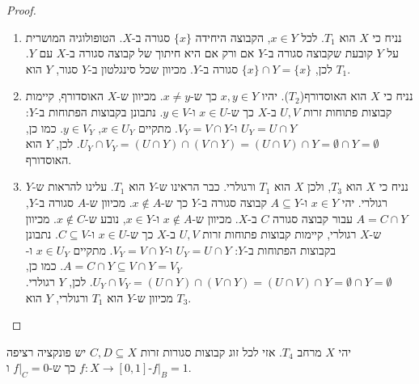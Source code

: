 \documentclass{tstextbook}
\begin{document}
\begin{proof}
  \begin{enumerate}
    \item נניח כי \(X\) הוא \(T_1\). לכל \(x \in Y\), הקבוצה היחידה \(\{x\}\) סגורה ב-\(X\). הטופולוגיה המושרית על \(Y\) קובעת שקבוצה סגורה ב-\(Y\) אם ורק אם היא חיתוך של קבוצה סגורה ב-\(X\) עם \(Y\). לכן, \(\{x\} \cap Y = \{x\}\) סגורה ב-\(Y\). מכיוון שכל סינגלטון ב-\(Y\) סגור, \(Y\) הוא \(T_1\). 


    \item נניח כי \(X\) הוא האוסדורף(\(T_{2}\)). יהיו \(x, y \in Y\) כך ש-\(x \neq y\). מכיוון ש-\(X\) האוסדורף, קיימות קבוצות פתוחות זרות \(U, V\) ב-\(X\) כך ש-\(x \in U\) ו-\(y \in V\). נתבונן בקבוצות הפתוחות ב-\(Y\): \(U_Y = U \cap Y\) ו-\(V_Y = V \cap Y\). מתקיים \(x \in U_Y\), \(y \in V_Y\). כמו כן, \(U_Y \cap V_Y = (U \cap Y) \cap (V \cap Y) = (U \cap V) \cap Y = \emptyset \cap Y = \emptyset\). לכן, \(Y\) הוא האוסדורף. 


    \item נניח כי \(X\) הוא \(T_3\), ולכן \(X\) הוא \(T_1\) ורגולרי. כבר הראינו ש-\(Y\) הוא \(T_1\). עלינו להראות ש-\(Y\) רגולרי. יהי \(x \in Y\) ו-\(A \subseteq Y\) קבוצה סגורה ב-\(Y\) כך ש-\(x \notin A\). מכיוון ש-\(A\) סגורה ב-\(Y\), \(A = C \cap Y\) עבור קבוצה סגורה \(C\) ב-\(X\). מכיוון ש-\(x \notin A\) ו-\(x \in Y\), נובע ש-\(x \notin C\). מכיוון ש-\(X\) רגולרי, קיימות קבוצות פתוחות זרות \(U, V\) ב-\(X\) כך ש-\(x \in U\) ו-\(C \subseteq V\). נתבונן בקבוצות הפתוחות ב-\(Y\): \(U_Y = U \cap Y\) ו-\(V_Y = V \cap Y\). מתקיים \(x \in U_Y\) ו-\(A = C \cap Y \subseteq V \cap Y = V_Y\). כמו כן, \(U_Y \cap V_Y = (U \cap Y) \cap (V \cap Y) = (U \cap V) \cap Y = \emptyset \cap Y = \emptyset\). לכן, \(Y\) רגולרי. מכיוון ש-\(Y\) הוא \(T_1\) ורגולרי, \(Y\) הוא \(T_3\). 


  \end{enumerate}
\end{proof}
\begin{proposition}
יהי \(X\) מרחב \(T_{4}\). אזי לכל זוג קבוצות סגורות זרות \(C,D\subseteq X\) יש פונקציה רציפה \(f:X\to[0,1]\) כך ש-\(f|_{C}=0\) ו-\(f|_{B}=1\).

\end{proposition}
\end{document}
